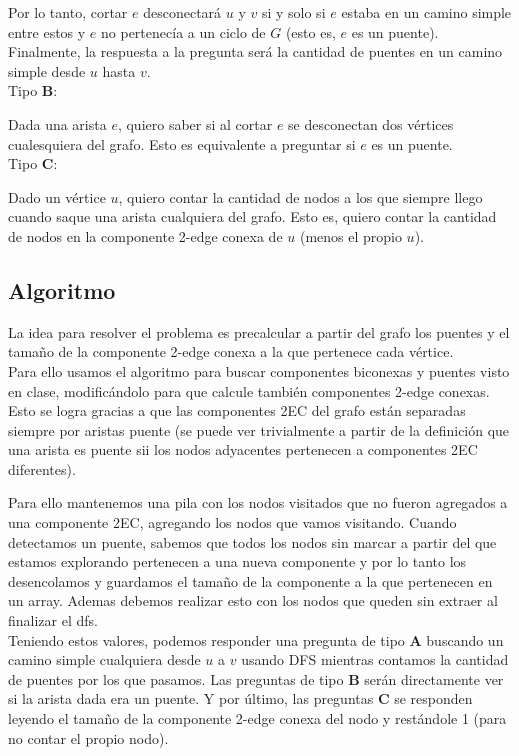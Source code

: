 Por lo tanto, cortar $e$ desconectará $u$ y $v$ si y solo si $e$ estaba en un camino simple entre estos y $e$ no pertenecía a un ciclo de $G$ (esto es, $e$ es un puente). Finalmente, la respuesta a la pregunta será la cantidad de puentes en un camino simple desde $u$ hasta $v$.
\\

\noindent Tipo \textbf{B}:

Dada una arista $e$, quiero saber si al cortar $e$ se desconectan dos vértices cualesquiera del grafo. Esto es equivalente a preguntar si $e$ es un puente.
\\

\noindent Tipo \textbf{C}:

Dado un vértice $u$, quiero contar la cantidad de nodos a los que siempre llego cuando saque una arista cualquiera del grafo. Esto es, quiero contar la cantidad de nodos en la componente 2-edge conexa de $u$ (menos el propio $u$).

\subsection{Algoritmo}

La idea para resolver el problema es precalcular a partir del grafo los puentes y el tamaño de la componente 2-edge conexa a la que pertenece cada vértice.
\\

Para ello usamos el algoritmo para buscar componentes biconexas y puentes visto en clase, modificándolo para que calcule también componentes 2-edge conexas. Esto se logra gracias a que las componentes 2EC del grafo están separadas siempre por aristas puente (se puede ver trivialmente a partir de la definición que una arista es puente sii los nodos adyacentes pertenecen a componentes 2EC diferentes).

Para ello mantenemos una pila con los nodos visitados que no fueron agregados a una componente 2EC, agregando los nodos que vamos visitando. Cuando detectamos un puente, sabemos que todos los nodos sin marcar a partir del que estamos explorando pertenecen a una nueva componente y por lo tanto los desencolamos y guardamos el tamaño de la componente a la que pertenecen en un array. Ademas debemos realizar esto con los nodos que queden sin extraer al finalizar el dfs.
\\

Teniendo estos valores, podemos responder una pregunta de tipo \textbf{A} buscando un camino simple cualquiera desde $u$ a $v$ usando DFS mientras contamos la cantidad de puentes por los que pasamos.
Las preguntas de tipo \textbf{B} serán directamente ver si la arista dada era un puente.
Y por último, las preguntas \textbf{C} se responden leyendo el tamaño de la componente 2-edge conexa del nodo y restándole 1 (para no contar el propio nodo).


